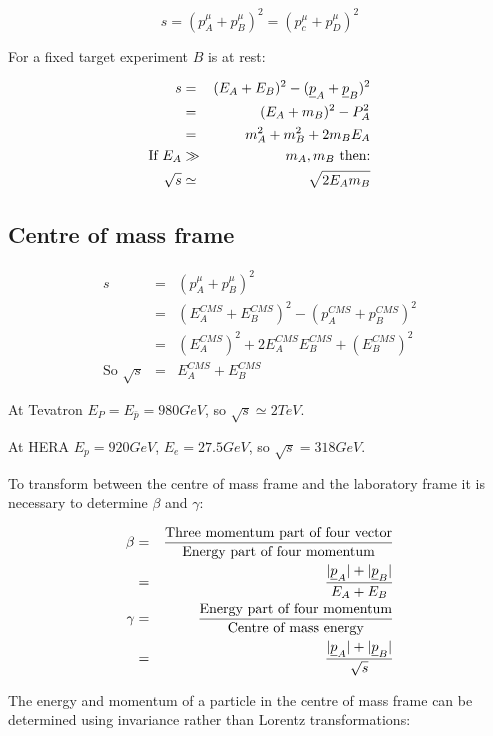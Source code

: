 \[
  s = (p^{\mu}_A + p^{\mu}_B)^2 = (p^{\mu}_c + p^{\mu}_D)^2
\]

For a fixed target experiment $B$ is at rest:

\begin{eqnarray*}
  s & = & (E_A + E_B)^2 - (\underline{p}_A + \underline{p}_B)^2 \\
    & = & (E_A + m_B)^2 - P^2_A \\
    & = & m^2_A + m^2_B + 2m_BE_A \\
    \textrm{If } E_A & \gg & m_A, m_B \textrm{ then:} \\
    \sqrt{s} & \simeq & \sqrt{2E_A m_B}
\end{eqnarray*}

\subsection{Centre of mass frame}

\begin{eqnarray*}
  s & = & \left(p^{\mu}_A + p^{\mu}_B \right)^2 \\
    & = & \left(E^{CMS}_A + E^{CMS}_B\right)^2 - \left(p^{CMS}_A + p^{CMS}_B\right)^2 \\
    & = & \left(E^{CMS}_A\right)^2 + 2E^{CMS}_AE^{CMS}_B + \left(E^{CMS}_B\right)^2 \\
  \textrm{So } \sqrt{s} & = & E^{CMS}_A + E^{CMS}_B
\end{eqnarray*}

At Tevatron $E_P = E_{\bar{p}} = 980 GeV$, so $\sqrt{s} \simeq 2TeV$.

At HERA $E_p = 920GeV$, $E_e = 27.5GeV$, so $\sqrt{s} = 318GeV$.

To transform between the centre of mass frame and the laboratory frame it is necessary to determine $\beta$ and $\gamma$:

\begin{eqnarray*}
  \beta & = & \frac{\textrm{Three momentum part of four vector}}{\textrm{Energy part of four momentum}} \\
  & = & \frac{|\underline{p}_A| + |\underline{p}_B|}{E_A + E_B} \\
  \gamma & = & \frac{\textrm{Energy part of four momentum}}{\textrm{Centre of mass energy}} \\
  & = & \frac{|\underline{p}_A| + |\underline{p}_B|}{\sqrt{s}}
\end{eqnarray*}

The energy and momentum of a particle in the centre of mass frame can be determined using invariance rather than Lorentz transformations:

